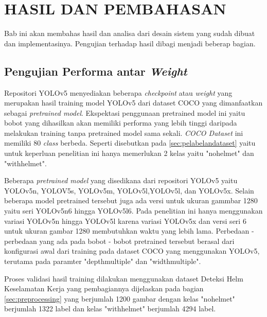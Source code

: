 \chapter{HASIL DAN PEMBAHASAN}
\label{chap:hasilpembahasan}


Bab ini akan membahas hasil dan analisa dari desain sistem yang sudah dibuat dan implementasinya. Pengujian terhadap hasil dibagi menjadi beberap bagian.

\section{Pengujian Performa antar \emph{Weight}}
\label{sec:ujiperforma}
\par Repositori YOLOv5 menyediakan beberapa \emph{checkpoint} atau \emph{weight} yang merupakan hasil training model YOLOv5 dari dataset COCO yang dimanfaatkan sebagai \emph{pretrained model}. Ekspektasi penggunaan pretrained model ini yaitu bobot yang dihasilkan akan memiliki performa yang lebih tinggi daripada melakukan training tanpa pretrained model sama sekali. \emph{COCO Dataset} ini memiliki 80 \emph{class} berbeda. Seperti disebutkan pada \ref{sec:pelabelandataset} yaitu untuk keperluan penelitian ini hanya memerlukan 2 kelas yaitu "no\textunderscore helmet" dan "with\textunderscore helmet". 

\par Beberapa \emph{pretrained model} yang disedikana dari repositori YOLOv5 yaitu YOLOv5n, YOLOV5s, YOLOv5m, YOLOv5l,YOLOv5l, dan YOLOv5x. Selain beberapa model pretrained tersebut juga ada versi untuk ukuran gammbar 1280 yaitu seri YOLOv5n6 hingga YOLOv5l6. Pada penelitian ini hanya menggunakan variasi YOLOv5n hingga YOLOv5l karena variasi YOLOv5x dan versi seri 6 untuk ukuran gambar 1280 membutuhkan waktu yang lebih lama. Perbedaan - perbedaan yang ada pada bobot - bobot pretrained tersebut berasal dari konfigurasi awal dari training pada dataset COCO yang menggunakan YOLOv5, terutama pada paramter "depth\textunderscore multiple" dan "width\textunderscore multiple".

\par Proses validasi hasil training dilakukan menggunakan dataset Deteksi Helm Keselamatan Kerja yang pembagiannya dijelaskan pada bagian \ref{sec:preprocessing} yang berjumlah 1200 gambar dengan kelas "no\textunderscore helmet" berjumlah 1322 label dan kelas "with\textunderscore helmet" berjumlah 4294 label.

